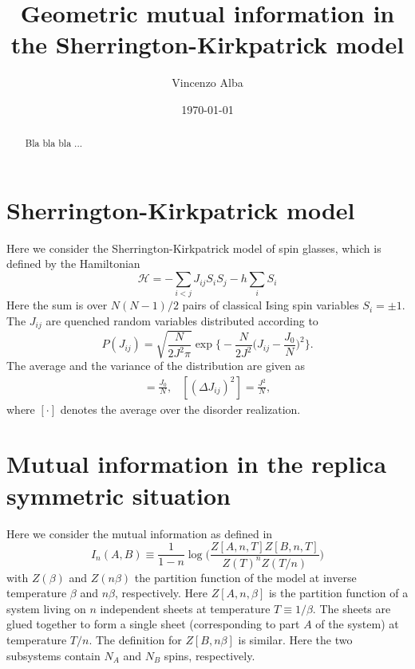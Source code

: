 \documentclass[onecolumn,superscriptaddress,pr]{revtex4}
\begin{document}
\author{Vincenzo Alba}

\date{\today}


\title{Geometric mutual information in the Sherrington-Kirkpatrick model} 


\begin{abstract} 
Bla bla bla ...
\end{abstract}


\maketitle

\section{Sherrington-Kirkpatrick model}

Here we consider the Sherrington-Kirkpatrick model of spin glasses, 
which is defined by the Hamiltonian
%
\begin{equation}
{\mathcal H}=-\sum\limits_{i<j}J_{ij}S_iS_j-h\sum_iS_i
\end{equation}
%
Here the sum is over $N(N-1)/2$ pairs of classical Ising spin variables 
$S_i=\pm 1$. The $J_{ij}$ are quenched random variables distributed 
according to 
%
\begin{equation}
P(J_{ij})=\sqrt{\frac{N}{2J^2\pi}}\exp\Big\{-\frac{N}{2J^2}
\Big(J_{ij}-\frac{J_0}{N}\Big)^2\Big\}.
\end{equation}
%
The average and the variance of the distribution are given as 
%
\begin{eqnarray}
[J_{ij}]=\frac{J_0}{N}, & [(\Delta J_{ij})^2]=\frac{J^2}{N}, 
\end{eqnarray}
%
where $[\cdot]$ denotes the average over the disorder realization. 

\section{Mutual information in the replica symmetric situation}

Here we consider the mutual information as defined in~\cite{stephan-2014} 
%
\begin{equation}
\label{mi_def}
I_n(A,B)\equiv\frac{1}{1-n}\log\Big(\frac{Z[A,n,T]Z[B,n,T]}{Z(T)^nZ(T/n)}
\Big)
\end{equation}
%
with $Z(\beta)$ and $Z(n\beta)$ the partition function of the model at 
inverse temperature $\beta$ and $n\beta$, respectively. Here $Z[A,n,\beta]$ 
is the partition function of a system living on $n$ independent sheets at 
temperature $T\equiv 1/\beta$. The sheets are glued together to form  a single 
sheet (corresponding to part $A$ of the system) at temperature $T/n$. The 
definition for $Z[B,n\beta]$ is similar. Here the two subsystems contain 
$N_A$ and $N_B$ spins, respectively. 
\end{document}
